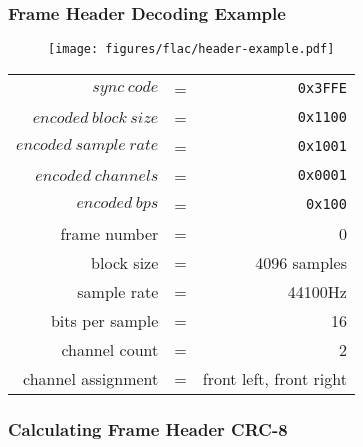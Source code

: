 \subsubsection{Frame Header Decoding Example}
\begin{figure}[h]
\texttt{[image: figures/flac/header-example.pdf]}
\end{figure}
\begin{tabular}{rcr}
$sync~code$ & = & \texttt{0x3FFE} \\
$encoded~block~size$ & = & \texttt{0x1100} \\
$encoded~sample~rate$ & = & \texttt{0x1001} \\
$encoded~channels$ & = & \texttt{0x0001} \\
$encoded~bps$ & = & \texttt{0x100} \\
frame number & = & 0 \\
block size & = & 4096 samples \\
sample rate & = & 44100Hz \\
bits per sample & = & 16 \\
channel count & = & 2 \\
channel assignment & = & front left, front right
\end{tabular}

\subsubsection{Calculating Frame Header CRC-8}

